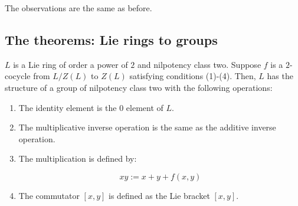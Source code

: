 \documentclass[10pt]{amsart}
\begin{document}
The observations are the same as before.

\subsection{The theorems: Lie rings to groups}

\begin{theorem}\label{lazardringtogroup1234}
  $L$ is a Lie ring of order a power of $2$ and nilpotency class
  two. Suppose $f$ is a $2$-cocycle from $L/Z(L)$ to $Z(L)$ satisfying
  conditions (1)-(4). Then, $L$ has the structure of a group of
  nilpotency class two with the following operations:

  \begin{enumerate}
  \item The identity element is the $0$ element of $L$.
  \item The multiplicative inverse operation is the same as the
    additive inverse operation.
  \item The multiplication is defined by:

    $$xy := x + y + f(x,y)$$

  \item The commutator $[x,y]$ is defined as the Lie bracket $[x,y]$.
  \end{enumerate}
\end{theorem}
\end{document}
